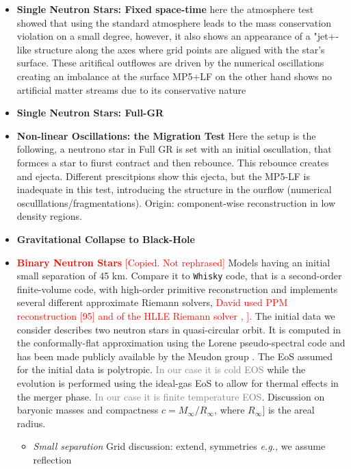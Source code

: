 \documentclass[11pt,a4paper,headinclude=true,DIV=14,BCOR=8mm,chapterprefix,listof=totoc,twoside,openright,abstracton]{scrbook}
\begin{document}
\begin{itemize}
    \item \textbf{Single Neutron Stars: Fixed space-time} here the atmosphere test showed that using the standard atmosphere leads to the mass conservation violation on a small degree, however, it also shows an appearance of a "jet+-like structure along the axes where grid points are aligned with the star's surface. These aritifical outflowes are driven by the numerical oscillations creating an imbalance at the surface MP5+LF on the other hand shows no artificial matter streams due to its conservative nature
    \item \textbf{Single Neutron Stars: Full-GR}
    \item \textbf{Non-linear Oscillations: the Migration Test} Here the setup is the following, a neutrono star in Full GR is set with an initial oscullation, that formces a star to fiurst contract and then rebounce. This rebounce creates and ejecta. Different prescitpions show this ejecta, but the MP5-LF is inadequate in this test, introducing the structure in the ourflow (numerical osculllations/fragmentations). Origin: component-wise reconstruction in low density regions.
    \item \textbf{Gravitational Collapse to Black-Hole}
    \item \textcolor{red}{\textbf{Binary Neutron Stars} [Copied. Not rephrased]} Models having an initial small separation of 45 km. Compare it to \texttt{Whisky} code, that is a second-order finite-volume code, with high-order primitive reconstruction and implements several different approximate Riemann solvers, \textcolor{red}{David used PPM reconstruction [95] and of the HLLE Riemann solver \cite{Harten:1983}, \cite{Einfeldt:1988}].} 
    The initial data we consider describes two neutron stars in quasi-circular orbit. It is computed in the conformally-flat approximation using the Lorene pseudo-spectral code \cite{Gourgoulhon:2000nn} and has been made publicly available by the Meudon group \cite{Lorene}. The EoS assumed for the initial data is polytropic. \textcolor{gray}{In our case it is cold EOS} while the evolution is performed using the ideal-gas EoS to allow for thermal effects in the merger phase. \textcolor{gray}{In our case it is finite temperature EOS}. Discussion on baryonic masses and compactness $c=M_{\infty}/R_{\infty}$, where $R_{\infty}]$ is the areal radius.
    \begin{itemize}
        \item \textit{Small separation} Grid discussion: extend, symmetries \textit{e.g.,} we assume reflection

\end{itemize}
\end{itemize}
\end{document}
